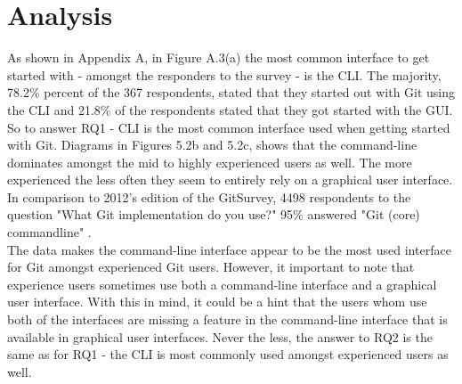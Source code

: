 \documentclass[a4paper,oneside]{bth} %
\begin{document}
		
		\chapter{Analysis}
				As shown in Appendix A, in Figure A.3(a) the most common interface to get started with - amongst the responders to the survey - is the CLI.
				The majority, 78.2\% percent of the 367 respondents, stated that they started out with Git using the CLI and 21.8\% of the respondents stated that they got started with the GUI.\\
				So to answer RQ1 - CLI is the most common interface used when getting started with Git.
				Diagrams in Figures 5.2b and 5.2c, shows that the command-line dominates amongst the mid to highly experienced users as well. The more experienced the less often they seem to entirely rely on a graphical user interface.\\
				In comparison to 2012's edition of the GitSurvey, 4498 respondents to the question "What Git implementation do you use?" 95\% answered "Git (core) commandline" \cite{GitStructure}.\\	
				The data makes the command-line interface appear to be the most used interface for Git amongst experienced Git users.
				However, it important to note that experience users sometimes use both a command-line interface and a graphical user interface.
				With this in mind, it could be a hint that the users whom use both of the interfaces are missing a feature in the command-line interface that is available in graphical user interfaces.
				Never the less, the answer to RQ2 is the same as for RQ1 - the CLI is most commonly used amongst experienced users as well.\\
				
\end{document}
